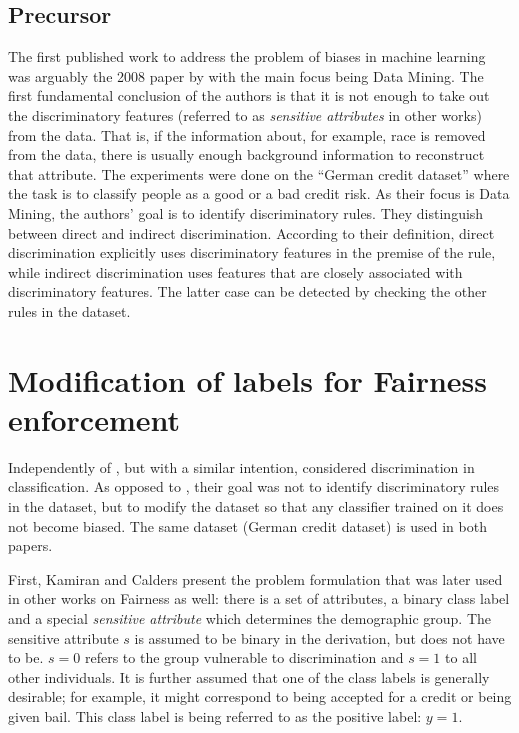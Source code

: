 \subsection{Precursor}\label{precursor}
The first published work to address the problem of biases in machine learning
was arguably the 2008 paper by \citet{pedreshi2008discrimination}
with the main focus being Data Mining.
The first fundamental conclusion of the authors
is that it is not enough to take out the discriminatory features
(referred to as \emph{sensitive attributes} in other works) from the data.
That is, if the information about, for example, race
is removed from the data,
there is usually enough background information to reconstruct that attribute.
The experiments were done on the ``German credit dataset''
where the task is to classify people as a good or a bad credit risk.
As their focus is Data Mining,
the authors' goal is to identify discriminatory rules.
They distinguish between direct and indirect discrimination.
According to their definition, direct discrimination explicitly uses
discriminatory features in the premise of the rule, while indirect discrimination uses
features that are closely associated with discriminatory features. The latter case can be
detected by checking the other rules in the dataset.

\section{Modification of labels for Fairness enforcement}\label{modification-of-labels-for-fairness-enforcement}
Independently of \citet{pedreshi2008discrimination}, but with a similar intention,
\citet{kamiran2009classifying} considered discrimination in classification.
As opposed to \citet{pedreshi2008discrimination}, their goal was not to identify discriminatory rules in the dataset,
but to modify the dataset so that any classifier trained on it does not become biased.
The same dataset (German credit dataset) is used in both papers.

First, Kamiran and Calders present the problem formulation
that was later used in other works on Fairness as well:
there is a set of attributes, a binary class label
and a special \emph{sensitive attribute} which determines the demographic group.
The sensitive attribute \(s\) is assumed to be binary in the derivation,
but does not have to be.
\(s=0\) refers to the group vulnerable to discrimination and \(s=1\) to all other individuals.
It is further assumed that one of the class labels is generally desirable;
for example, it might correspond to being accepted for a credit or being given bail.
This class label is being referred to as the positive label: \(y = 1\).

